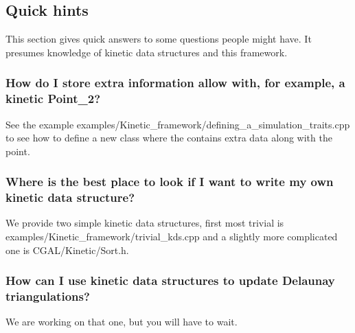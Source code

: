 \subsection{Quick hints \label{sec:quick_hints}}

This section gives quick answers to some questions people might have.
It presumes knowledge of kinetic data structures and this framework.

\subsubsection{How do I store extra information allow with, for example, a kinetic Point\_2?}
See the example
examples/Kinetic_framework/defining_a_simulation_traits.cpp to see how
to define a new  class where the
 contains extra data along with the point.

\subsubsection{Where is the best place to look if I want to write my own kinetic data structure?}
We provide two simple kinetic data structures, first most trivial is
examples/Kinetic_framework/trivial_kds.cpp and a slightly more
complicated one is CGAL/Kinetic/Sort.h.

\subsubsection{How can I use kinetic data structures to update Delaunay triangulations?}
We are working on that one, but you will have to wait.



